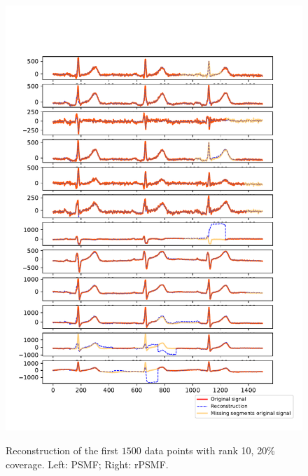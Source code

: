 \documentclass{mldsmsc}
\begin{document}
\begin{figure}[h!]
\begin{minipage}{0.4\linewidth}
    \includegraphics[width=\linewidth]{images/missing/rpsmf_output_20_10_half.pdf}
    \label{fig:augmented}
\end{minipage}
\caption{Reconstruction of the first $1500$ data points with rank 10, 20\% coverage. Left: PSMF; Right: rPSMF.}
\label{fig:mrec10}
\end{figure}
\end{document}
